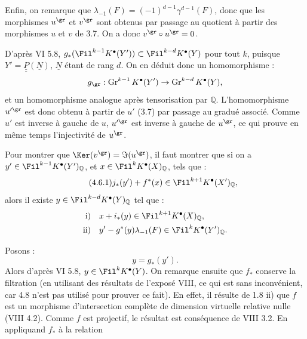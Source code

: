 
Enfin, on remarque que \(\lambda_{-1}(F)=(-1)^{d-1}\gamma^{d-1}(F)\), donc que les morphismes \(u^{\gr}\) et \(v^{\gr}\) sont obtenus par passage au quotient à partir des morphismes \(u\) et \(v\) de 3.7. On a donc \(v^{\gr}\circ u^{\gr}=0\).

D'après VI 5.8, \(g_*(\Fil^{k-1}K^{\bullet}(Y'))\subset \Fil^{k-d}K^{\bullet}(Y)\) pour tout \(k\), puisque \(Y'=\underline{\underline{P}}(\underline{N})\), \(\underline{N}\) étant de rang \(d\). On en déduit donc un homomorphisme :
\[
  g_{\gr}:\operatorname{Gr}^{k-1}K^{\bullet}(Y')
  \to\operatorname{Gr}^{k-d}K^{\bullet}(Y),
\]
et un homomorphisme analogue après tensorisation par \(\mathbb Q\). L'homomorphisme \(u'^{\gr}\) est donc obtenu à partir de \(u'\) (3.7) par passage au gradué associé. Comme \(u'\) est inverse à gauche de \(u\), \(u'^{\gr}\) est inverse à gauche de \(u^{\gr}\), ce qui prouve en même temps l'injectivité de \(u^{\gr}\).

Pour montrer que \(\Ker(v^{\gr})=\Im(u^{\gr})\), il faut montrer que si on a \(y'\in\Fil^{k-1}K^{\bullet}(Y')_{\mathbb Q}\), et \(x\in\Fil^kK^{\bullet}(X)_{\mathbb Q}\), tels que :
\begin{equation}\tag{4.6.1}
  j_*(y')+f^*(x)\in\Fil^{k+1}K^{\bullet}(X')_{\mathbb Q},
\end{equation}
alors il existe \(y\in\Fil^{k-d}K^{\bullet}(Y)_{\mathbb Q}\) tel que :
\[
\begin{aligned}
\text{i)}\quad &x+i_*(y)\in\Fil^{k+1}K^{\bullet}(X)_{\mathbb Q},\\
\text{ii)}\quad &y'-g^*(y)\lambda_{-1}(F)\in\Fil^{k}K^{\bullet}(Y')_{\mathbb Q}.
\end{aligned}
\]

Posons :
\[
  y=g_*(y').
\]
Alors d'après VI 5.8, \(y\in\Fil^{k}K^{\bullet}(Y)\). On remarque ensuite que \(f_*\) conserve la filtration (en utilisant des résultats de l'exposé VIII, ce qui est sans inconvénient, car 4.8 n'est pas utilisé pour prouver ce fait). En effet, il résulte de 1.8 ii) que \(f\) est un morphisme d'intersection complète de dimension virtuelle relative nulle (VIII 4.2). Comme \(f\) est projectif, le résultat est conséquence de VIII 3.2. En appliquand \(f_*\) à la relation
